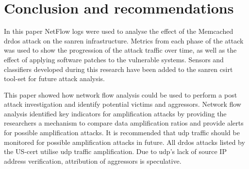 \section{Conclusion and recommendations}
\label{sec5}

In this paper NetFlow logs were used to analyse the effect of the Memcached \gls{drdos} attack on the \gls{sanren} infrastructure. Metrics from each phase of the attack was used to show the progression of the attack traffic over time, as well as the effect of applying software patches to the vulnerable systems. Sensors and classifiers developed during this research have been added to the \gls{sanren} \gls{csirt} tool-set for future attack analysis. 

This paper showed how network flow analysis could be used to perform a post attack investigation and identify potential victims and aggressors. Network flow analysis identified key indicators for amplification attacks by providing the researchers a mechanism to compare data amplification ratios and provide alerts for possible amplification attacks. It is recommended that \gls{udp} traffic should be monitored for possible amplification attacks in future. All \gls{drdos} attacks listed by the US-\gls{cert}  \cite{USCert2018} utilise \gls{udp} traffic amplification. Due to \gls{udp}'s lack of source IP address verification, attribution of aggressors is speculative.